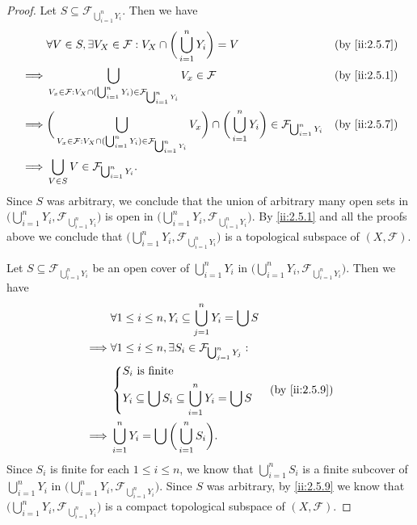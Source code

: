 \begin{proof}
  Let \(S \subseteq \mathcal{F}_{\bigcup_{i = 1}^n Y_i}\).
  Then we have
  \begin{align*}
             & \forall V \in S, \exists V_X \in \mathcal{F} : V_X \cap \bigg(\bigcup_{i = 1}^n Y_i\bigg) = V                                                                                                           &  & \by{ii:2.5.7} \\
    \implies & \bigcup_{V_x \in \mathcal{F} : V_X \cap (\bigcup_{i = 1}^n Y_i) \in \mathcal{F}_{\bigcup_{i = 1}^n Y_i}} V_x \in \mathcal{F}                                                                            &  & \by{ii:2.5.1} \\
    \implies & \bigg(\bigcup_{V_x \in \mathcal{F} : V_X \cap (\bigcup_{i = 1}^n Y_i) \in \mathcal{F}_{\bigcup_{i = 1}^n Y_i}} V_x\bigg) \cap \bigg(\bigcup_{i = 1}^n Y_i\bigg) \in \mathcal{F}_{\bigcup_{i = 1}^n Y_i} &  & \by{ii:2.5.7} \\
    \implies & \bigcup_{V \in S} V \in \mathcal{F}_{\bigcup_{i = 1}^n Y_i}.
  \end{align*}
  Since \(S\) was arbitrary, we conclude that the union of arbitrary many open sets in \(\big(\bigcup_{i = 1}^n Y_i, \mathcal{F}_{\bigcup_{i = 1}^n Y_i}\big)\) is open in \(\big(\bigcup_{i = 1}^n Y_i, \mathcal{F}_{\bigcup_{i = 1}^n Y_i}\big)\).
  By \cref{ii:2.5.1} and all the proofs above we conclude that \(\big(\bigcup_{i = 1}^n Y_i, \mathcal{F}_{\bigcup_{i = 1}^n Y_i}\big)\) is a topological subspace of \((X, \mathcal{F})\).

  Let \(S \subseteq \mathcal{F}_{\bigcup_{i = 1}^n Y_i}\) be an open cover of \(\bigcup_{i = 1}^n Y_i\) in \(\big(\bigcup_{i = 1}^n Y_i, \mathcal{F}_{\bigcup_{i = 1}^n Y_i}\big)\).
  Then we have
  \begin{align*}
             & \forall 1 \leq i \leq n, Y_i \subseteq \bigcup_{j = 1}^n Y_i = \bigcup S       \\
    \implies & \forall 1 \leq i \leq n, \exists S_i \in \mathcal{F}_{\bigcup_{j = 1}^n Y_j} : \\
             & \begin{dcases}
                 S_i \text{ is finite} \\
                 Y_i \subseteq \bigcup S_i \subseteq \bigcup_{i = 1}^n Y_i = \bigcup S
               \end{dcases}          &  & \by{ii:2.5.9}           \\
    \implies & \bigcup_{i = 1}^n Y_i = \bigcup \bigg(\bigcup_{i = 1}^n S_i\bigg).
  \end{align*}
  Since \(S_i\) is finite for each \(1 \leq i \leq n\), we know that \(\bigcup_{i = 1}^n S_i\) is a finite subcover of \(\bigcup_{i = 1}^n Y_i\) in \(\big(\bigcup_{i = 1}^n Y_i, \mathcal{F}_{\bigcup_{i = 1}^n Y_i}\big)\).
  Since \(S\) was arbitrary, by \cref{ii:2.5.9} we know that \(\big(\bigcup_{i = 1}^n Y_i, \mathcal{F}_{\bigcup_{i = 1}^n Y_i}\big)\) is a compact topological subspace of \((X, \mathcal{F})\).


\end{proof}

